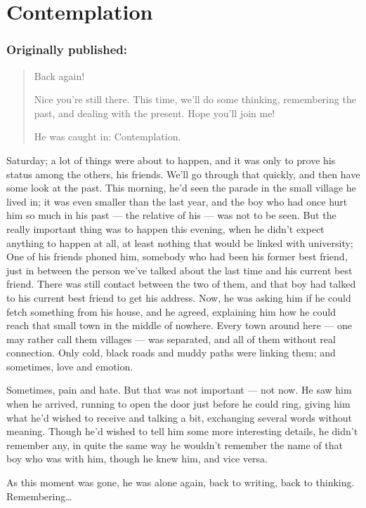 \chapter{Contemplation}
\label{cha:contemplation}
\subsection*{Originally published: }
\begin{quote}
Back again!

Nice you're still there. This time, we'll do some thinking, remembering the past, and dealing with the present. Hope you'll join me!

He was caught in: Contemplation.
\end{quote}

Saturday; a lot of things were about to happen, and it was only to prove his status among the others, his friends. We'll go through that quickly, and then have some look at the past. 
This morning, he'd seen the parade in the small village he lived in; it was even smaller than the last year, and the boy who had once hurt him so much in his past --- the relative of his --- was not to be seen. But the really important thing was to happen this evening, when he didn't expect anything to happen at all, at least nothing that would be linked with university; One of his friends phoned him, somebody who had been his former best friend, just in between the person we've talked about the last time and his current best friend. There was still contact between the two of them, and that boy had talked to his current best friend to get his address. Now, he was asking him if he could fetch something from his house, and he agreed, explaining him how he could reach that small town in the middle of nowhere. Every town around here --- one may rather call them villages --- was separated, and all of them without real connection. Only cold, black roads and muddy paths were linking them; and sometimes, love and emotion.

Sometimes, pain and hate. But that was not important --- not now. He saw him when he arrived, running to open the door just before he could ring, giving him what he'd wished to receive and talking a bit, exchanging several words without meaning. Though he'd wished to tell him some more interesting details, he didn't remember any, in quite the same way he wouldn't remember the name of that boy who was with him, though he knew him, and vice versa.

As this moment was gone, he was alone again, back to writing, back to thinking. 
Remembering\dots{}

